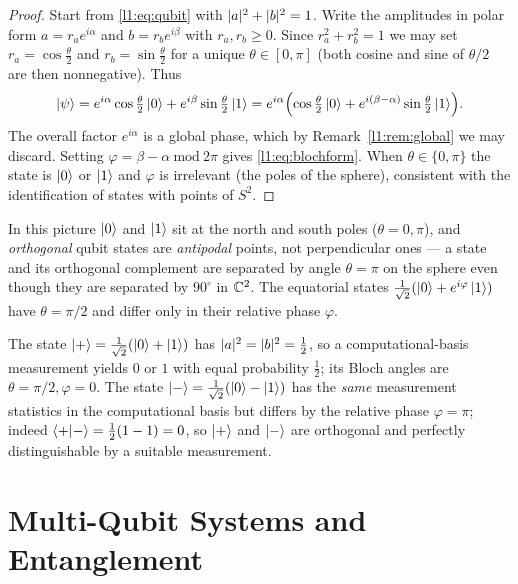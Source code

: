 \begin{proof}
Start from \eqref{l1:eq:qubit} with $\lvert a\rvert^{2}+\lvert b\rvert^{2}=1$. Write the amplitudes in
polar form $a=r_a e^{i\alpha}$ and $b=r_b e^{i\beta}$ with $r_a,r_b\ge0$. Since
$r_a^{2}+r_b^{2}=1$ we may set $r_a=\cos\tfrac{\theta}{2}$ and
$r_b=\sin\tfrac{\theta}{2}$ for a unique $\theta\in[0,\pi]$ (both cosine and sine of
$\theta/2$ are then nonnegative). Thus
\[
  \ket{\psi}=e^{i\alpha}\cos\tfrac{\theta}{2}\ket{0}+e^{i\beta}\sin\tfrac{\theta}{2}\ket{1}
           =e^{i\alpha}\Bigl(\cos\tfrac{\theta}{2}\ket{0}+e^{i(\beta-\alpha)}\sin\tfrac{\theta}{2}\ket{1}\Bigr).
\]
The overall factor $e^{i\alpha}$ is a global phase, which by
Remark~\ref{l1:rem:global} we may discard. Setting $\varphi=\beta-\alpha\ \mathrm{mod}\ 2\pi$
gives \eqref{l1:eq:blochform}. When $\theta\in\{0,\pi\}$ the state is $\ket{0}$ or
$\ket{1}$ and $\varphi$ is irrelevant (the poles of the sphere), consistent with the
identification of states with points of $S^{2}$.
\end{proof}

\begin{remark}
In this picture $\ket{0}$ and $\ket{1}$ sit at the north and south poles
($\theta=0,\pi$), and \emph{orthogonal} qubit states are \emph{antipodal} points,
not perpendicular ones --- a state and its orthogonal complement are separated by
angle $\theta=\pi$ on the sphere even though they are separated by $90^{\circ}$ in
$\mathbb{C}^{2}$. The equatorial states $\tfrac{1}{\sqrt2}(\ket{0}+e^{i\varphi}\ket{1})$ have
$\theta=\pi/2$ and differ only in their relative phase $\varphi$.
\end{remark}

\begin{example}
The state $\ket{+}=\tfrac{1}{\sqrt2}(\ket{0}+\ket{1})$ has
$\lvert a\rvert^{2}=\lvert b\rvert^{2}=\tfrac12$, so a computational-basis measurement yields $0$ or
$1$ with equal probability $\tfrac12$; its Bloch angles are
$\theta=\pi/2,\varphi=0$. The state $\ket{-}=\tfrac{1}{\sqrt2}(\ket{0}-\ket{1})$ has
the \emph{same} measurement statistics in the computational basis but differs by the
relative phase $\varphi=\pi$; indeed $\braket{+|-}=\tfrac12(1-1)=0$, so $\ket{+}$ and
$\ket{-}$ are orthogonal and perfectly distinguishable by a suitable measurement.
\end{example}

\section{Multi-Qubit Systems and Entanglement}

